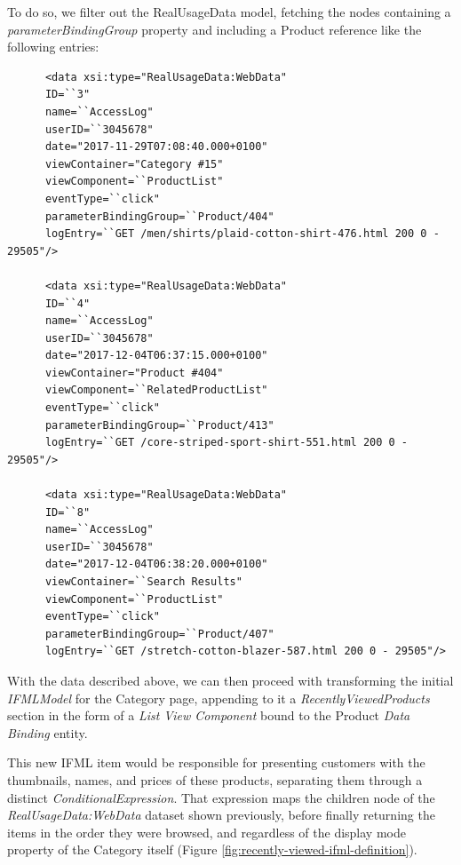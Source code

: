 To do so, we filter out the RealUsageData model, fetching the nodes containing a \textit{parameterBindingGroup} property and including a Product reference like the following entries:

\vspace{0.5cm}
\lstset{language=XML}
\begin{lstlisting} 
      <data xsi:type="RealUsageData:WebData"
      ID=``3"
      name=``AccessLog"
      userID=``3045678"
      date="2017-11-29T07:08:40.000+0100"
      viewContainer="Category #15"
      viewComponent=``ProductList"
      eventType=``click"
      parameterBindingGroup=``Product/404"
      logEntry=``GET /men/shirts/plaid-cotton-shirt-476.html 200 0 - 29505"/>
      
      <data xsi:type="RealUsageData:WebData"
      ID=``4"
      name=``AccessLog"
      userID=``3045678"
      date="2017-12-04T06:37:15.000+0100"
      viewContainer="Product #404"
      viewComponent=``RelatedProductList"
      eventType=``click"
      parameterBindingGroup=``Product/413"
      logEntry=``GET /core-striped-sport-shirt-551.html 200 0 - 29505"/>

      <data xsi:type="RealUsageData:WebData"
      ID=``8"
      name=``AccessLog"
      userID=``3045678"
      date="2017-12-04T06:38:20.000+0100"
      viewContainer=``Search Results"
      viewComponent=``ProductList"
      eventType=``click"
      parameterBindingGroup=``Product/407"
      logEntry=``GET /stretch-cotton-blazer-587.html 200 0 - 29505"/>
\end{lstlisting}
\vspace{0.5cm}

With the data described above, we can then proceed with transforming the initial \textit{IFMLModel} for the Category page, appending to it a \textit{RecentlyViewedProducts} section in the form of a \textit{List View Component} bound to the Product \textit{Data Binding} entity.

This new IFML item would be responsible for presenting customers with the thumbnails, names, and prices of these products, separating them through a distinct \textit{ConditionalExpression}. That expression maps the children node of the \textit{RealUsageData:WebData} dataset shown previously, before finally returning the items in the order they were browsed, and regardless of the display mode property of the Category itself (Figure \ref{fig:recently-viewed-ifml-definition}).

